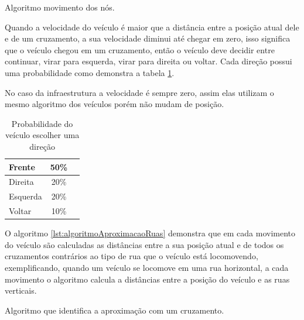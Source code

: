 \begin{algorithm}
	\scriptsize
	\caption{Algoritmo movimento dos nós.}
	\label{lst:algoritmoComportamentoNos}
\end{algorithm} 

Quando a velocidade do veículo é maior que a distância entre a posição atual dele e de um cruzamento, a sua velocidade diminui até chegar em zero, isso significa que o veículo chegou em um cruzamento, então o veículo deve decidir entre continuar, virar para esquerda, virar para direita ou voltar. Cada direção possui uma probabilidade como demonstra a tabela \ref{tab:probabilidadeEscolhaDirecao}.

No caso da infraestrutura a velocidade é sempre zero, assim elas utilizam o mesmo algoritmo dos veículos porém não mudam de posição.

\begin{table}[ht]
	\centering
	\begin{tabular}{ | l | c | r}
		\hline
		Frente & 50\% \\ \hline
		Direita & 20\% \\ \hline
		Esquerda & 20\% \\ \hline
		Voltar & 10\% \\ \hline 
	\end{tabular}
	\caption{Probabilidade do veículo escolher uma direção}
	\label{tab:probabilidadeEscolhaDirecao}
\end{table}

O algoritmo \ref{lst:algoritmoAproximacaoRuas} demonstra que em cada movimento do veículo são calculadas as distâncias entre a sua posição atual e de todos os cruzamentos contrários ao tipo de rua que o veículo está locomovendo, exemplificando, quando um veículo se locomove em uma rua horizontal, a cada movimento o algoritmo calcula a distâncias entre a posição do veículo e as ruas verticais.

	\begin{algorithm}
	\scriptsize
	\caption{Algoritmo que identifica a aproximação com um cruzamento.}
	\label{lst:algoritmoAproximacaoRuas}
\end{algorithm}


